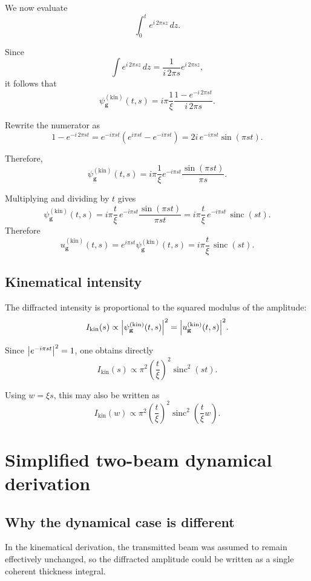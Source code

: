\documentclass[11pt]{article}
\begin{document}
We now evaluate
\[
\int_0^t e^{i\,2\pi s z}\,dz.
\]

Since
\[
\int e^{i\,2\pi s z}\,dz
=
\frac{1}{i\,2\pi s}e^{i\,2\pi s z},
\]
it follows that
\[
\psi_{\mathbf g}^{(\mathrm{kin})}(t,s)
=
i\pi \frac{1}{\xi}\frac{1-e^{-i\,2\pi s t}}{i\,2\pi s}.
\]

Rewrite the numerator as
\[
1-e^{-i\,2\pi s t}
=
e^{-i\pi s t}\left(e^{i\pi s t}-e^{-i\pi s t}\right)
=
2i\,e^{-i\pi s t}\sin(\pi s t).
\]

Therefore,
\[
\psi_{\mathbf g}^{(\mathrm{kin})}(t,s)
=
i\pi \frac{1}{\xi}e^{-i\pi s t}\frac{\sin(\pi s t)}{\pi s}.
\]

Multiplying and dividing by \(t\) gives
\[
\psi_{\mathbf g}^{(\mathrm{kin})}(t,s)
=
i\pi\frac{t}{\xi}\,e^{-i\pi s t}\frac{\sin(\pi s t)}{\pi s t}
=
i\pi\frac{t}{\xi}\,e^{-i\pi s t}\,\operatorname{sinc}(st).
\]
Therefore
\[
u_{\mathbf g}^{(\mathrm{kin})}(t,s)
=
e^{i\pi s t}\psi_{\mathbf g}^{(\mathrm{kin})}(t,s)
=
i\pi\frac{t}{\xi}\,\operatorname{sinc}(st).
\]

\subsection{Kinematical intensity}

The diffracted intensity is proportional to the squared modulus of the amplitude:
\[
I_{\mathrm{kin}}(s)\propto
\abs{\psi_{\mathbf g}^{(\mathrm{kin})}(t,s)}^2
=
\abs{u_{\mathbf g}^{(\mathrm{kin})}(t,s)}^2.
\]

Since \(\abs{e^{-i\pi s t}}^2=1\), one obtains directly
\[
I_{\mathrm{kin}}(s)\propto \pi^2\left(\frac{t}{\xi}\right)^2 \operatorname{sinc}^2(st).
\]

Using \(w=\xi s\), this may also be written as
\[
I_{\mathrm{kin}}(w)\propto
\pi^2\left(\frac{t}{\xi}\right)^2
\operatorname{sinc}^2\!\left(\frac{t}{\xi}w\right).
\]


\section{Simplified two-beam dynamical derivation}

\subsection{Why the dynamical case is different}

In the kinematical derivation, the transmitted beam was assumed to remain effectively unchanged, so the diffracted amplitude could be written as a single coherent thickness integral.
\end{document}
